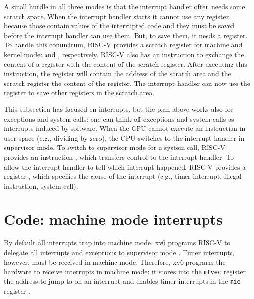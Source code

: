 A small hurdle in all three modes is that the interrupt handler often
needs some scratch space. When the interrupt handler starts it cannot
use any register because those contain values of the interrupted code
and they must be saved before the interrupt handler can use them. But,
to save them, it needs a register.  To handle this conundrum,
RISC-V provides a scratch register for machine and kernel
mode:  and , respectively.
RISC-V also has an instruction to exchange the content
of a register with the content of the scratch register. After
executing this instruction, the register will contain the address of
the scratch area and the scratch register the content of the
register. The interrupt handler can now use the register to save other
registers in the scratch area.

This subsection has focused on interrupts, but the plan above works
also for exceptions and system calls: one can think off exceptions and
system calls as interrupts induced by software.  When the CPU
cannot execute an instruction in user space (e.g., dividing by zero),
the CPU switches to the interrupt handler in supervisor mode.  To
switch to supervisor mode for a system call, RISC-V provides
an instruction , which transfers control to the
interrupt handler.  To allow the interrupt handler to tell which
interrupt happened, RISC-V provides a register
, which specifies the cause of the interrupt (e.g.,
timer interrupt, illegal instruction, system call).


\section{Code: machine mode interrupts}

By default all interrupts trap into machine mode.  xv6 programs
RISC-V to delegate all interrupts and exceptions to supervisor mode
.
Timer interrupts, however, must be received in machine
mode. Therefore, xv6 programs the hardware to receive interrupts in
machine mode: it stores into the \lstinline{mtvec} register the
address to jump to on an interrupt 
and enables timer interrupts in the \lstinline{mie} register
.

